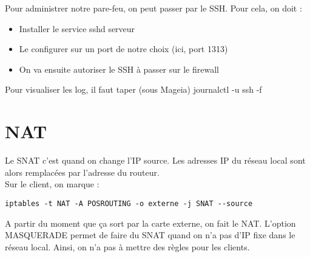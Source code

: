 Pour administrer notre pare-feu, on peut passer par le SSH. Pour cela, on doit :
\begin{itemize}
 \item Installer le service sshd serveur
 \item Le configurer sur un port de notre choix (ici, port 1313)
 \item On va ensuite autoriser le SSH à passer sur le firewall
\end{itemize}
Pour visualiser les log, il faut taper (sous Mageia) journalctl -u ssh -f
\section{NAT}
Le SNAT c'est quand on change l'IP source. Les adresses IP du réseau local sont alors remplacées par l'adresse du routeur.\\
Sur le client, on marque :
\begin{lstlisting}[style=custombash]
iptables -t NAT -A POSROUTING -o externe -j SNAT --source
\end{lstlisting}
A partir du moment que ça sort par la carte externe, on fait le NAT.
L'option MASQUERADE permet de faire du SNAT quand on n'a pas d'IP fixe dans le réseau local. Ainsi, on n'a pas à mettre des règles pour les clients.